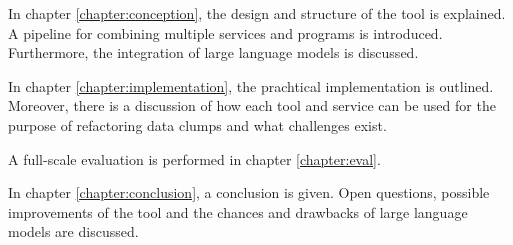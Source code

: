 In chapter \ref{chapter:conception}, the design and structure of the tool is explained. A pipeline for combining multiple services and programs is introduced. Furthermore, the integration of large language models is discussed. 

In chapter \ref{chapter:implementation}, the prachtical implementation is outlined.  Moreover, there is a discussion of how each tool and service can be used for the purpose of refactoring data clumps and what challenges exist. 

A full-scale evaluation is performed in chapter \ref{chapter:eval}.

In chapter \ref{chapter:conclusion}, a conclusion is given. Open questions, possible improvements of the tool and the chances and drawbacks of large language models are discussed.
